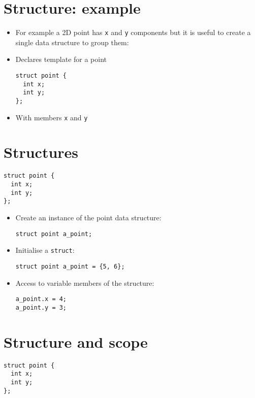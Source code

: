 \documentclass{article}
\begin{document}
\section{Structure: example}
\begin{itemize}
\item For example a 2D point has \verb!x! and \verb!y! components but it is useful to create a single data structure to group them: 


\item Declares template for a point

\begin{verbatim}
struct point {
  int x;
  int y;
};
\end{verbatim}

\item With members \verb!x! and \verb!y!
\end{itemize}



\section{Structures}
\begin{verbatim}
struct point {
  int x;
  int y;
};
\end{verbatim}

\begin{itemize}
\item Create an instance of the point data structure:
\begin{verbatim}
struct point a_point;
\end{verbatim}

\item Initialise a \verb!struct!:
\begin{verbatim}
struct point a_point = {5, 6};
\end{verbatim}

\item Access to variable members of the structure:
\begin{verbatim}
a_point.x = 4;
a_point.y = 3;
\end{verbatim}
\end{itemize}



\section{Structure and scope}
\begin{verbatim}
struct point {
  int x;
  int y;
};
\end{verbatim}
\end{document}
